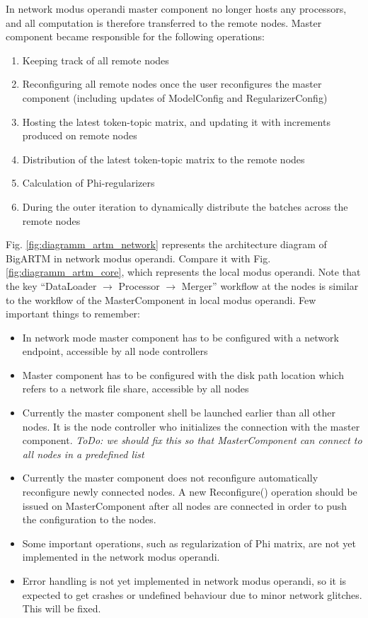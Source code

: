 \documentclass[11pt,a4paper,twoside]{report}
\begin{document}
In network modus operandi master component no longer hosts any processors,
and all computation is therefore transferred to the remote nodes.
Master component became responsible for the following operations:
\begin{enumerate}
\item Keeping track of all remote nodes
\item Reconfiguring all remote nodes once the user reconfigures the master component
      (including updates of ModelConfig and RegularizerConfig)
\item Hosting the latest token-topic matrix, and updating it with increments produced on remote nodes
\item Distribution of the latest token-topic matrix to the remote nodes
\item Calculation of Phi-regularizers
\item During the outer iteration to dynamically distribute the batches across the remote nodes
\end{enumerate}

Fig. \ref{fig:diagramm_artm_network} represents the architecture diagram of BigARTM in network modus operandi.
Compare it with Fig. \ref{fig:diagramm_artm_core}, which represents the local modus operandi.
Note that the key  ``DataLoader $\rightarrow$ Processor $\rightarrow$ Merger'' workflow
at the nodes is similar to the workflow of the MasterComponent in local modus operandi.
Few important things to remember:
\begin{itemize}
    \item In network mode master component has to be configured with a network endpoint,
          accessible by all node controllers
    \item Master component has to be configured with the disk path location which refers
          to a network file share, accessible by all nodes
    \item Currently the master component shell be launched earlier than all other nodes.
          It is the node controller who initializes the connection with the master component.
          \emph{ToDo: we should fix this so that MasterComponent can connect to all nodes in a predefined list}
    \item Currently the master component does not reconfigure automatically reconfigure newly connected nodes.
          A new Reconfigure() operation should be issued on MasterComponent
          after all nodes are connected in order to push the configuration to the nodes.
    \item Some important operations, such as regularization of Phi matrix,
          are not yet implemented in the network modus operandi.
    \item Error handling is not yet implemented in network modus operandi,
          so it is expected to get crashes or undefined behaviour due to minor network glitches.
          This will be fixed.
\end{itemize}
\end{document}
